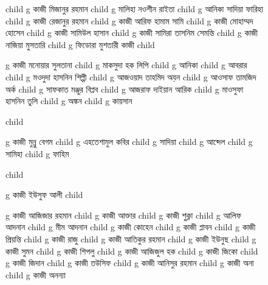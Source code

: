 \documentclass{article}
\begin{document}
\begin{figure}
{\begin{genealogypicture}
{{{{{{{              child{    g{ কাজী মিজানুর রহমান }  
                  child{    g{ মালিহা নওশীন রাইতা    }   }
                  child{    g{ আনিকা সাদিয়া ফারিহা }   }
              }
              child{    g{ কাজী রেজানুর রহমান } 
                  child{    g{ কাজী আরিফ হামাম সামি }   }
              }
            }
            child{
              g{ কাজী মোহাম্মদ হোসেন }
              child{    g{ কাজী সামিউল হাসান  } 
                child{ g{ কাজী সামিরা তাসনিম সেমন্তি }  }
                }
              child{    g{ কাজী নাজিয়া মুসতারি }
              child{ g{ ফিডোরা মুশতারী কাজী  }  }
              }
            }
            child{
              g{ কাজী মনোয়ার সুলতানা }
                child{ g{ মাকসুদা হক লিপি }
                  child{ g{ আনিকা }  }
                  child{ g{ আবরার }  }
                }
                child{ g{ মওদুদা হাসনিন শিল্পী }
                    child{ g{ আজওয়াদ তাহমিদ অয়ন  }  }
                    child{ g{ আওসাফ তামজিদ অর্ক }  }
                  }
                child{ g{ সাফকাত মঞ্জুর বিপ্লব } 
                child{ g{ আজরাফ দাইয়ান আরিক }  }
                }
                child{ g{ মাওসুফা হাসনিন তুলি }
                  child{ g{ অঙ্কন }  }
                  child{ g{ কায়সান }  }
                }

            }%
            child{
              g{ কাজী মুন্নু বেগম}
               child{ g{ এহতেশামুল কবির }
                    child{ g{ সাদিয়া }  }
                    child{ g{ আব্দেল}  }
                    child{ g{ সামিহা }  }
                    child{ g{ ফাহিম }  }
               }

            }

          }       
        }
      }
      child{
        g{ কাজী ইউসুফ আলী }
          child{    g{ কাজী আজিজার রহমান } 
              child{    g{ কাজী আক্তার }
                child{    g{ কাজী শুক্লা } 
                child{ g{ আলিফ আদনান }  }
                child{ g{ মীম আদনান }  }
                }
                child{    g{ কাজী কোহেন } 
                    child{    g{ কাজী প্লাবন }   }
                    child{    g{ কাজী প্রিয়ন্তি }   }
                  }
                child{    g{ কাজী রাজু }   }  
              }
              child{    g{ কাজী আতিকুর রহমান }   }
              child{    g{ কাজী ইউনুছ } 
                  child{    g{ কাজী সুমন }   }
                  child{    g{ কাজী শিপলু  }   }
              }
              child{    g{ কাজী আজিজুল হক }
                  child{    g{ কাজী জিকো } child{    g{ কাজী জিদান }   }   }
                  child{    g{ কাজী তউসিফ }   }
              }
              child{    g{ কাজী আনিসুর রহমান } 
                  child{    g{ কাজী অনা  }   }
                  child{    g{ কাজী অনন্যা }   }
              }

}}}}}
\end{genealogypicture}}
\end{figure}
\end{document}
